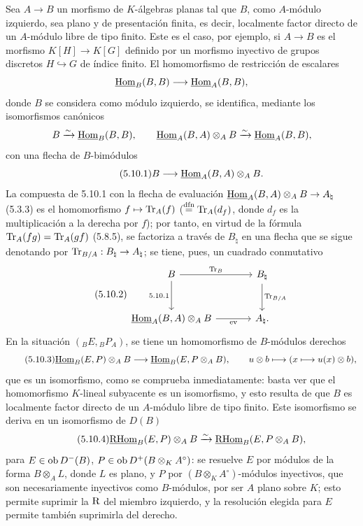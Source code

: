 Sea $A\to B$ un morfismo de $K$-álgebras planas tal que $B$, como $A$-módulo izquierdo, sea plano y de presentación finita, es decir, localmente factor directo de un $A$-módulo libre de tipo finito. Este es el caso, por ejemplo, si $A\to B$ es el morfismo $K[H]\to K[G]$ definido por un morfismo inyectivo de grupos discretos $H\hookrightarrow G$ de índice finito. El homomorfismo de restricción de escalares
\[
\underline{\operatorname{Hom}}_B(B,B)\longrightarrow\underline{\operatorname{Hom}}_A(B,B),
\]
donde $B$ se considera como módulo izquierdo, se identifica, mediante los isomorfismos canónicos
\[
B\xrightarrow{\sim}\underline{\operatorname{Hom}}_B(B,B),\qquad \underline{\operatorname{Hom}}_A(B,A)\otimes_AB\xrightarrow{\sim}\underline{\operatorname{Hom}}_A(B,B),
\]
con una flecha de $B$-bimódulos
\begin{equation}\tag{5.10.1}
B\longrightarrow\underline{\operatorname{Hom}}_A(B,A)\otimes_AB.
\end{equation}
La compuesta de 5.10.1 con la flecha de evaluación $\underline{\operatorname{Hom}}_A(B,A)\otimes_AB\to A_\natural$ (5.3.3) es el homomorfismo $f\mapsto\operatorname{Tr}_A(f)$ ($\stackrel{\mathrm{dfn}}{=}\operatorname{Tr}_A(d_f)$, donde $d_f$ es la multiplicación a la derecha por $f$); por tanto, en virtud de la fórmula $\operatorname{Tr}_A(fg)=\operatorname{Tr}_A(gf)$ (5.8.5), se factoriza a través de $B_\natural$ en una flecha que se sigue denotando por $\operatorname{Tr}_{B/A}:B_\natural\to A_\natural$; se tiene, pues, un cuadrado conmutativo
\begin{equation}\tag{5.10.2}
\begin{tikzcd}[column sep=large,row sep=large]
B \arrow[r,"\Tr_B"] \arrow[d,"5.10.1"'] & B_\natural \arrow[d,"\Tr_{B/A}"]\\
\uHom_A(B,A)\otimes_AB \arrow[r,"\mathrm{ev}"'] & A_\natural .
\end{tikzcd}
\end{equation}
En la situación $({}_BE,{}_BP_A)$, se tiene un homomorfismo de $B$-módulos derechos
\begin{equation}\tag{5.10.3}
\underline{\operatorname{Hom}}_B(E,P)\otimes_AB\longrightarrow\underline{\operatorname{Hom}}_B(E,P\otimes_AB),\qquad
u\otimes b\longmapsto(x\longmapsto u(x)\otimes b),
\end{equation}
que es un isomorfismo, como se comprueba inmediatamente: basta ver que el homomorfismo $K$-lineal subyacente es un isomorfismo, y esto resulta de que $B$ es localmente factor directo de un $A$-módulo libre de tipo finito. Este isomorfismo se deriva en un isomorfismo de $D(B)$
\begin{equation}\tag{5.10.4}
\underline{\mathrm{RHom}}_B(E,P)\otimes_AB\xrightarrow{\sim}\underline{\mathrm{RHom}}_B(E,P\otimes_AB),
\end{equation}
para $E\in\operatorname{ob} D^-(B)$, $P\in\operatorname{ob} D^+(B\otimes_KA^\circ)$: se resuelve $E$ por módulos de la forma $B\otimes_AL$, donde $L$ es plano, y $P$ por $(B\otimes_KA^\circ)$-módulos inyectivos, que son necesariamente inyectivos como $B$-módulos, por ser $A$ plano sobre $K$; esto permite suprimir la $\mathrm{R}$ del miembro izquierdo, y la resolución elegida para $E$ permite también suprimirla del derecho.
